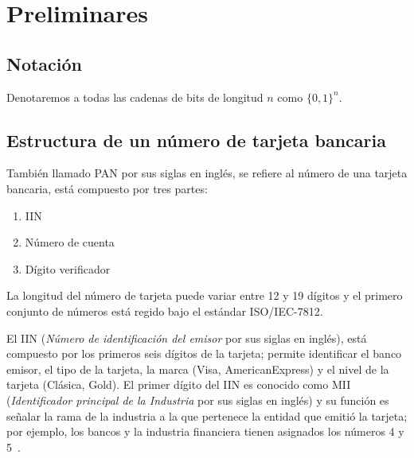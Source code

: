 %
%

\section{Preliminares}


\subsection{Notación}



Denotaremos a todas las cadenas de bits de longitud $ n $ como $ \{ 0, 1 \}^n $.

\subsection{Estructura de un número de tarjeta bancaria}
También llamado PAN por sus siglas en inglés, se refiere al número de una
tarjeta bancaria, está compuesto por tres partes:
  \begin{enumerate}
    \item IIN
    \item Número de cuenta
    \item Dígito verificador
  \end{enumerate}
  La longitud del número de tarjeta puede variar entre 12 y 19 dígitos y el
  primero conjunto de números está regido bajo el estándar ISO/IEC-7812.

  El IIN (\textit{Número de identificación del emisor} por sus siglas en
  inglés), está compuesto por los primeros seis dígitos de la tarjeta; permite
  identificar el banco emisor, el tipo de la tarjeta, la marca (Visa,
  AmericanExpress) y el nivel de la tarjeta (Clásica, Gold).  El primer dígito
  del IIN es conocido como MII (\textit{Identificador principal de la Industria}
  por sus siglas en inglés) y su función es señalar la rama de la industria a la
  que pertenece la entidad que emitió la tarjeta; por ejemplo, los bancos y la
  industria financiera tienen asignados los números 4 y 5~\cite{iso_7812}.

